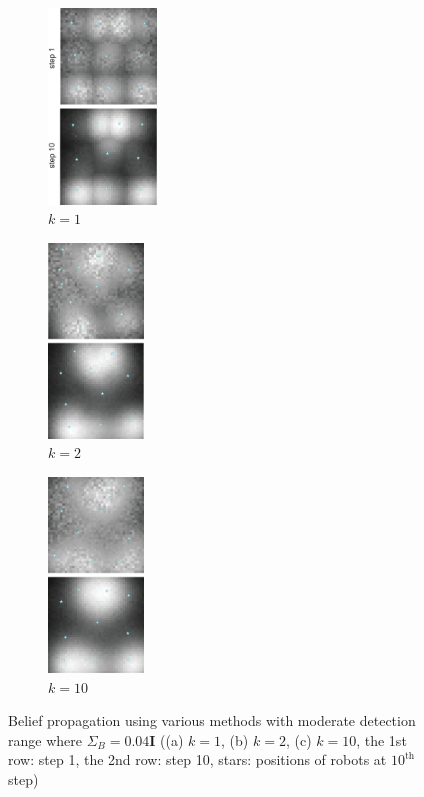 \documentclass[journal]{IEEEtran}
\begin{document}
\begin{figure}
	\centering
	 \begin{subfigure}[b]{0.169\textwidth}
	 	\centering
		\includegraphics[width=1.132in]{figure/order1_step_0110}
		\caption{$k=1$}
	\end{subfigure}
	\begin{subfigure}[b]{0.15\textwidth}
		\centering
		\includegraphics[width=1in]{figure/order2_step_0110}
		\caption{$k=2$}
	\end{subfigure}
	 \begin{subfigure}[b]{0.15\textwidth}
	\centering
	\includegraphics[width=1in]{figure/ordern_step_0110}
	\caption{$k=10$}
\end{subfigure}
	\caption{Belief propagation using various methods with moderate detection range where $\Sigma_B = 0.04\mathbf{I}$ ((a) $k=1$, (b) $k=2$, (c) $k=10$, the 1st row: step 1, the 2nd row: step 10, stars: positions of robots at $10^{\text{th}}$ step)}
	\label{fig:fig3}
\end{figure}
\end{document}

